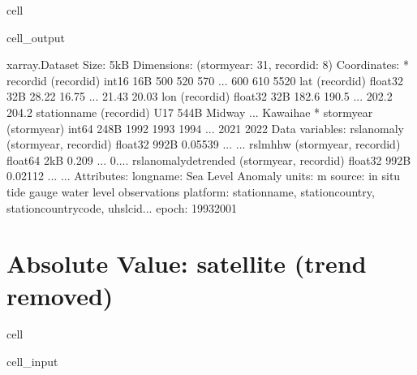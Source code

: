 \documentclass[letterpaper,10pt,english]{jupyterBook}
\begin{document}
\begin{sphinxuseclass}{cell}
\begin{sphinxVerbatimOutput}
\begin{sphinxuseclass}{cell_output}
\begin{sphinxVerbatim}[commandchars=\\\{\}]
\PYGZlt{}xarray.Dataset\PYGZgt{} Size: 5kB
Dimensions:                (storm\PYGZus{}year: 31, record\PYGZus{}id: 8)
Coordinates:
  * record\PYGZus{}id              (record\PYGZus{}id) int16 16B 500 520 570 ... 600 610 5520
    lat                    (record\PYGZus{}id) float32 32B 28.22 16.75 ... 21.43 20.03
    lon                    (record\PYGZus{}id) float32 32B 182.6 190.5 ... 202.2 204.2
    station\PYGZus{}name           (record\PYGZus{}id) \PYGZlt{}U17 544B \PYGZsq{}Midway\PYGZsq{} ... \PYGZsq{}Kawaihae\PYGZsq{}
  * storm\PYGZus{}year             (storm\PYGZus{}year) int64 248B 1992 1993 1994 ... 2021 2022
Data variables:
    rsl\PYGZus{}anomaly            (storm\PYGZus{}year, record\PYGZus{}id) float32 992B \PYGZhy{}0.05539 ... ...
    rsl\PYGZus{}mhhw               (storm\PYGZus{}year, record\PYGZus{}id) float64 2kB \PYGZhy{}0.209 ... \PYGZhy{}0....
    rsl\PYGZus{}anomaly\PYGZus{}detrended  (storm\PYGZus{}year, record\PYGZus{}id) float32 992B \PYGZhy{}0.02112 ... ...
Attributes:
    long\PYGZus{}name:  Sea Level Anomaly
    units:      m
    source:     in situ tide gauge water level observations
    platform:   station\PYGZus{}name, station\PYGZus{}country, station\PYGZus{}country\PYGZus{}code, uhslc\PYGZus{}id...
    epoch:      1993\PYGZhy{}2001
\end{sphinxVerbatim}

\end{sphinxuseclass}\end{sphinxVerbatimOutput}

\end{sphinxuseclass}

\chapter{Absolute Value: satellite (trend removed)}
\label{\detokenize{notebooks/regional_and_local/SL_anomaly_annual:absolute-value-satellite-trend-removed}}
\begin{sphinxuseclass}{cell}\begin{sphinxVerbatimInput}

\begin{sphinxuseclass}{cell_input}
\begin{sphinxVerbatim}[commandchars=\\\{\}]
    
\end{sphinxVerbatim}

\end{sphinxuseclass}\end{sphinxVerbatimInput}

\end{sphinxuseclass}
\end{document}
